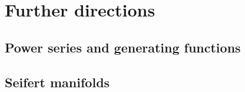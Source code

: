 \chapter{Further directions}
\section{Power series and generating functions}
\section{Seifert manifolds}
